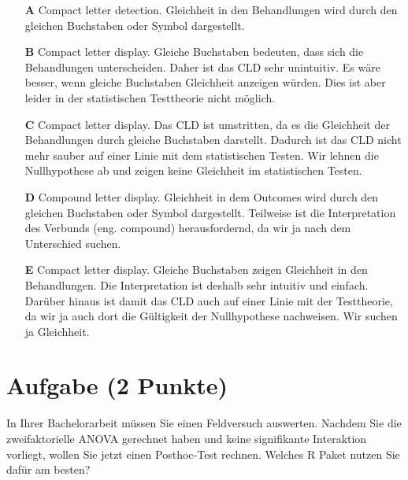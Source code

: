 \documentclass[a4paper, 9pt]{scrartcl}\usepackage[]{graphicx}\usepackage[]{xcolor}
\begin{document}
\begin{enumerate}
\item [\textbf{A} \msquare] Compact letter detection. Gleichheit in den Behandlungen wird durch den gleichen Buchstaben oder Symbol dargestellt.
\item [\textbf{B} \msquare] Compact letter display. Gleiche Buchstaben bedeuten, dass sich die Behandlungen unterscheiden. Daher ist das CLD sehr unintuitiv. Es wäre besser, wenn gleiche Buchstaben Gleichheit anzeigen würden. Dies ist aber leider in der statistischen Testtheorie nicht möglich.
\item [\textbf{C} \msquare] Compact letter display. Das CLD ist umstritten, da es die Gleichheit der Behandlungen durch gleiche Buchstaben darstellt. Dadurch ist das CLD nicht mehr sauber auf einer Linie mit dem statistischen Testen. Wir lehnen die Nullhypothese ab und zeigen keine Gleichheit im statistischen Testen.
\item [\textbf{D} \msquare] Compound letter display. Gleichheit in dem Outcomes wird durch den gleichen Buchstaben oder Symbol dargestellt. Teilweise ist die Interpretation des Verbunds (eng. compound) herausfordernd, da wir ja nach dem Unterschied suchen.
\item [\textbf{E} \msquare] Compact letter display. Gleiche Buchstaben zeigen Gleichheit in den Behandlungen. Die Interpretation ist deshalb sehr intuitiv und einfach. Darüber hinaus ist damit das CLD auch auf einer Linie mit der Testtheorie, da wir ja auch dort die Gültigkeit der Nullhypothese nachweisen. Wir suchen ja Gleichheit.
\end{enumerate}

\section{Aufgabe \hfill (2 Punkte)}




In Ihrer Bachelorarbeit müssen Sie einen Feldversuch auswerten. Nachdem Sie die zweifaktorielle ANOVA gerechnet haben und keine signifikante Interaktion vorliegt, wollen Sie jetzt einen Posthoc-Test rechnen. Welches R Paket nutzen Sie dafür am besten?
\end{document}
